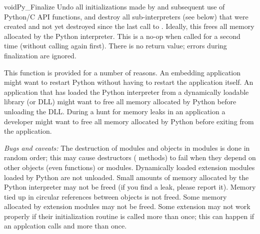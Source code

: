 \documentclass[twoside,openright]{report}
\begin{document}
\begin{cfuncdesc}{void}{Py_Finalize}{}
Undo all initializations made by  and subsequent 
use of Python/C API functions, and destroy all sub-interpreters (see 
 below) that were created and not yet 
destroyed since the last call to .  Ideally,
this frees all memory allocated by the Python interpreter.  This is a
no-op when called for a second time (without calling
 again first).  There is no return value; errors
during finalization are ignored.

This function is provided for a number of reasons.  An embedding 
application might want to restart Python without having to restart the 
application itself.  An application that has loaded the Python 
interpreter from a dynamically loadable library (or DLL) might want to 
free all memory allocated by Python before unloading the DLL. During a 
hunt for memory leaks in an application a developer might want to free 
all memory allocated by Python before exiting from the application.

\emph{Bugs and caveats:} The destruction of modules and objects in 
modules is done in random order; this may cause destructors 
( methods) to fail when they depend on other objects 
(even functions) or modules.  Dynamically loaded extension modules 
loaded by Python are not unloaded.  Small amounts of memory allocated 
by the Python interpreter may not be freed (if you find a leak, please 
report it).  Memory tied up in circular references between objects is 
not freed.  Some memory allocated by extension modules may not be 
freed.  Some extension may not work properly if their initialization 
routine is called more than once; this can happen if an applcation 
calls  and  more than once.
\end{cfuncdesc}
\end{document}
